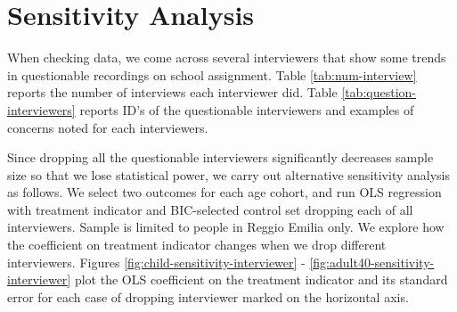


\doublespacing

\section{Sensitivity Analysis}

When checking data, we come across several interviewers that show some trends in questionable recordings on school assignment. Table \ref{tab:num-interview} reports the number of interviews each interviewer did. Table \ref{tab:question-interviewers} reports ID's of the questionable interviewers and examples of concerns noted for each interviewers. 

Since dropping all the questionable interviewers significantly decreases sample size so that we lose statistical power, we carry out alternative sensitivity analysis as follows. We select two outcomes for each age cohort, and run OLS regression with treatment indicator and BIC-selected control set dropping each of all interviewers. Sample is limited to people in Reggio Emilia only. We explore how the coefficient on treatment indicator changes when we drop different interviewers. Figures \ref{fig:child-sensitivity-interviewer} - \ref{fig:adult40-sensitivity-interviewer} plot the OLS coefficient on the treatment indicator and its standard error for each case of dropping interviewer marked on the horizontal axis.

